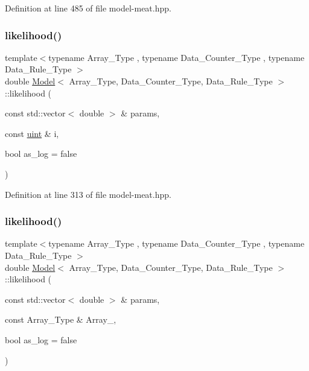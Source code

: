 Definition at line 485 of file model-\/meat.\+hpp.

\mbox{\label{class_model_ae75fe2213980b6b245e279c7836ab99b}} 
\subsubsection{\texorpdfstring{likelihood()}{likelihood()}\hspace{0.1cm}{\footnotesize\ttfamily [1/3]}}
{\footnotesize\ttfamily template$<$typename Array\+\_\+\+Type , typename Data\+\_\+\+Counter\+\_\+\+Type , typename Data\+\_\+\+Rule\+\_\+\+Type $>$ \\
double \hyperlink{class_model}{Model}$<$ Array\+\_\+\+Type, Data\+\_\+\+Counter\+\_\+\+Type, Data\+\_\+\+Rule\+\_\+\+Type $>$\+::likelihood (\begin{DoxyParamCaption}\item[{const std\+::vector$<$ double $>$ \&}]{params,  }\item[{const \hyperlink{typedefs_8hpp_a91ad9478d81a7aaf2593e8d9c3d06a14}{uint} \&}]{i,  }\item[{bool}]{as\+\_\+log = {\ttfamily false} }\end{DoxyParamCaption})\hspace{0.3cm}{\ttfamily [inline]}}



Definition at line 313 of file model-\/meat.\+hpp.

\mbox{\label{class_model_a1a11a54860e22fbd152de4d7cfd30b89}} 
\subsubsection{\texorpdfstring{likelihood()}{likelihood()}\hspace{0.1cm}{\footnotesize\ttfamily [2/3]}}
{\footnotesize\ttfamily template$<$typename Array\+\_\+\+Type , typename Data\+\_\+\+Counter\+\_\+\+Type , typename Data\+\_\+\+Rule\+\_\+\+Type $>$ \\
double \hyperlink{class_model}{Model}$<$ Array\+\_\+\+Type, Data\+\_\+\+Counter\+\_\+\+Type, Data\+\_\+\+Rule\+\_\+\+Type $>$\+::likelihood (\begin{DoxyParamCaption}\item[{const std\+::vector$<$ double $>$ \&}]{params,  }\item[{const Array\+\_\+\+Type \&}]{Array\+\_\+,  }\item[{bool}]{as\+\_\+log = {\ttfamily false} }\end{DoxyParamCaption})\hspace{0.3cm}{\ttfamily [inline]}}



